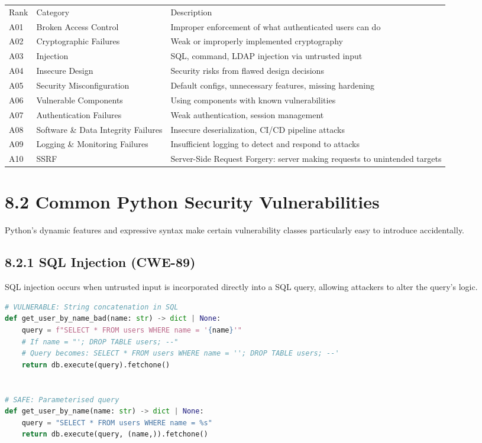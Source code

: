 \documentclass[11pt,a4paper]{book}
\begin{document}
\begin{tabular}{lll}
\hline
Rank & Category & Description \\
A01 & Broken Access Control & Improper enforcement of what authenticated users can do \\
A02 & Cryptographic Failures & Weak or improperly implemented cryptography \\
A03 & Injection & SQL, command, LDAP injection via untrusted input \\
A04 & Insecure Design & Security risks from flawed design decisions \\
A05 & Security Misconfiguration & Default configs, unnecessary features, missing hardening \\
A06 & Vulnerable Components & Using components with known vulnerabilities \\
A07 & Authentication Failures & Weak authentication, session management \\
A08 & Software \& Data Integrity Failures & Insecure deserialization, CI/CD pipeline attacks \\
A09 & Logging \& Monitoring Failures & Insufficient logging to detect and respond to attacks \\
A10 & SSRF & Server-Side Request Forgery: server making requests to unintended targets \\
\hline
\end{tabular}

\medskip

\section{8.2 Common Python Security Vulnerabilities}

Python's dynamic features and expressive syntax make certain vulnerability classes particularly easy to introduce accidentally.

\subsection{8.2.1 SQL Injection (CWE-89)}

SQL injection occurs when untrusted input is incorporated directly into a SQL query, allowing attackers to alter the query's logic.

\begin{lstlisting}[language=Python]
# VULNERABLE: String concatenation in SQL
def get_user_by_name_bad(name: str) -> dict | None:
    query = f"SELECT * FROM users WHERE name = '{name}'"
    # If name = "'; DROP TABLE users; --"
    # Query becomes: SELECT * FROM users WHERE name = ''; DROP TABLE users; --'
    return db.execute(query).fetchone()


# SAFE: Parameterised query
def get_user_by_name(name: str) -> dict | None:
    query = "SELECT * FROM users WHERE name = %s"
    return db.execute(query, (name,)).fetchone()
\end{lstlisting}
\end{document}
